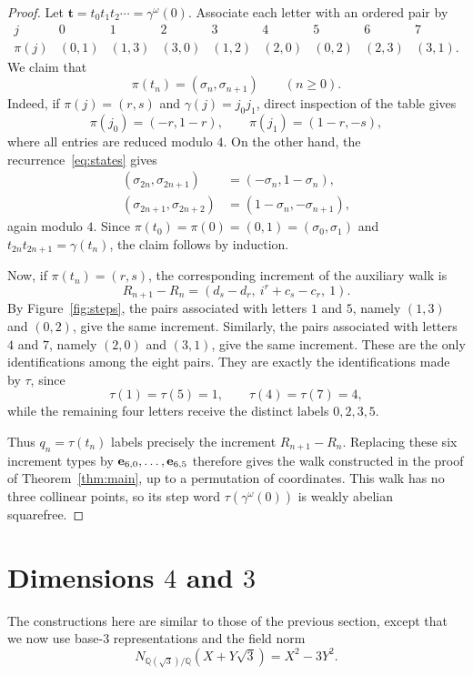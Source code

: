 \documentclass[12pt,reqno]{article}
\newcommand{\Q}{\mathbb{Q}}
\begin{document}
\begin{proof}
Let $\mathbf t=t_0t_1t_2\cdots=\gamma^\omega(0)$.
Associate each letter with an ordered pair  by
\[
\begin{array}{c|cccccccc}
j&0&1&2&3&4&5&6&7\\ \hline
\pi(j)&(0,1)&(1,3)&(3,0)&(1,2)&(2,0)&(0,2)&(2,3)&(3,1).
\end{array}
\]
We claim that
\[
\pi(t_n)=(\sigma_n,\sigma_{n+1}) \qquad(n\geq0).
\]
Indeed, if $\pi(j)=(r,s)$ and $\gamma(j)=j_0j_1$, direct
inspection of the table gives
\[
\pi(j_0)=(-r,1-r),\qquad
\pi(j_1)=(1-r,-s),
\]
where all entries are reduced modulo $4$. On the other hand,
the recurrence~\eqref{eq:states} gives
\begin{align*}
(\sigma_{2n},\sigma_{2n+1})
  &=(-\sigma_n,1-\sigma_n),\\
(\sigma_{2n+1},\sigma_{2n+2})
  &=(1-\sigma_n,-\sigma_{n+1}),
\end{align*}
again modulo $4$. Since
$\pi(t_0)=\pi(0)=(0,1)=(\sigma_0,\sigma_1)$ and
$t_{2n}t_{2n+1}=\gamma(t_n)$, the claim follows by induction.

Now, if $\pi(t_n)=(r,s)$, the corresponding increment of the
auxiliary walk is
\[
R_{n+1}-R_n=(d_s-d_r,\ i^r+c_s-c_r,\ 1).
\]
By Figure~\ref{fig:steps}, the pairs associated with letters
$1$ and $5$, namely $(1,3)$ and $(0,2)$, give the same
increment. Similarly, the pairs associated with letters $4$
and $7$, namely $(2,0)$ and $(3,1)$, give the same increment.
These are the only identifications among the eight pairs.
They are exactly the identifications made by $\tau$, since
\[
\tau(1)=\tau(5)=1,\qquad
\tau(4)=\tau(7)=4,
\]
while the remaining four letters receive the distinct labels
$0,2,3,5$.

Thus $q_n=\tau(t_n)$ labels precisely the increment
$R_{n+1}-R_n$. Replacing these six increment types by
${\bf e}_{6,0},\ldots,{\bf e}_{6,5}$ therefore gives the walk
constructed in the proof of Theorem~\ref{thm:main}, up to a
permutation of coordinates. This walk has no three collinear
points, so its step word $\tau(\gamma^\omega(0))$ is weakly
abelian squarefree.
\end{proof}



\section{Dimensions $4$ and $3$}\label{sec:34}

The constructions here are similar to those of the previous section,
except that we now use base-$3$ representations and the field norm
\[
 N_{\Q(\sqrt3)/\Q}(X+Y\sqrt3)=X^2-3Y^2.
\]
\end{document}
